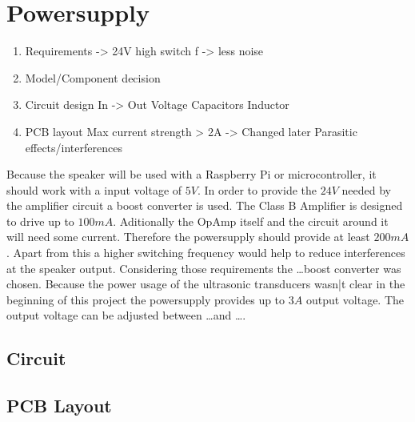 \section{Powersupply}

\begin{enumerate}
  \item Requirements
   -> 24V
  \subitem high switch f -> less noise
  \item Model/Component decision
  \item Circuit design
  \subitem In -> Out Voltage
  \subitem Capacitors
  \subitem Inductor
  \item PCB layout
  \subitem Max current strength
  \subsubitem > 2A -> Changed later
  \subitem Parasitic effects/interferences
\end{enumerate}

Because the speaker will be used with a Raspberry Pi or microcontroller, it should work with a input voltage of $5V$. In order to provide the $24V$ needed by the amplifier circuit a boost converter is used.\p
The Class B Amplifier is designed to drive up to $100mA$. Aditionally the OpAmp itself and the circuit around it will need some current. Therefore the powersupply should provide at least $200mA$. Apart from this a higher switching frequency would help to reduce interferences at the speaker output.\p
%
Considering those requirements the \dots boost converter was chosen. Because the power usage of the ultrasonic transducers wasn|t clear in the beginning of this project the powersupply provides up to $3A$ output voltage. The output voltage can be adjusted between \dots and \dots.

\subsection{Circuit}


\subsection{PCB Layout}